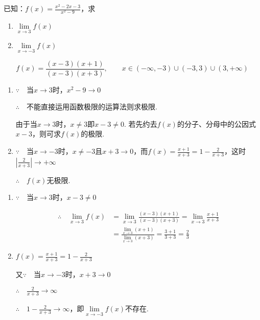 \begin{example}
已知：$f(x)=\frac{x^2-2x-3}{x^2-9}$，求
\begin{multicols}{2}
\begin{enumerate}[(1)]
    \item $\lim\limits_{x\to 3}f(x)$
    \item $\lim\limits_{x\to -3}f(x)$
\end{enumerate}
\end{multicols}
\end{example}

\begin{analyze}
\[f(x)=\frac{(x-3)(x+1)}{(x-3)(x+3)},\qquad x\in(-\infty,-3)\cup(-3,3)\cup(3,+\infty)\]
\begin{enumerate}[(1)]
    \item $\because\quad $当$x\to3$时，$x^2-9\to 0$
    
    $\therefore\quad $不能直接运用函数极限的运算法则求极限.

    由于当$x\to 3$时，$x\ne 3$即$x-3\ne 0$. 若先约去$f(x)$的分子、分母中的公因式$x-3$，则可求$f(x)$的极限.

\item $\because\quad $当$x\to-3$时，$x\ne -3$且$x+3\to 0$，而$f(x)=\frac{x+1}{x+3}=1-\frac{2}{x+3}$，这时$\left|\frac{2}{x+3}\right|\to +\infty$

$\therefore\quad f(x)$无极限.
\end{enumerate}
\end{analyze}

\begin{solution}
\begin{enumerate}[(1)]
    \item $\because\quad $当$x\to 3$时，$x-3\ne 0$

\[\begin{split}
    \therefore\quad \lim\limits_{x\to 3}f(x)&=\lim\limits_{x\to 3}\frac{(x-3)(x+1)}{(x-3)(x+3)}
    =\lim\limits_{x\to 3}\frac{x+1}{x+3}\\
    &=\frac{\lim\limits_{x\to 3}(x+1)}{\lim\limits_{x\to 3}(x+3)}=\frac{3+1}{3+3}=\frac{2}{3}
\end{split} \]


\item $f(x)=\frac{x+1}{x+3}=1-\frac{2}{x+3}$

又$\because\quad $当$x\to -3$时，$x+3\to 0$

$\therefore\quad \frac{2}{x+3}\to \infty$

$\therefore\quad 1-\frac{2}{x+3}\to\infty$，即$\lim\limits_{x\to-3}f(x)$不存在.
\end{enumerate}
\end{solution}

